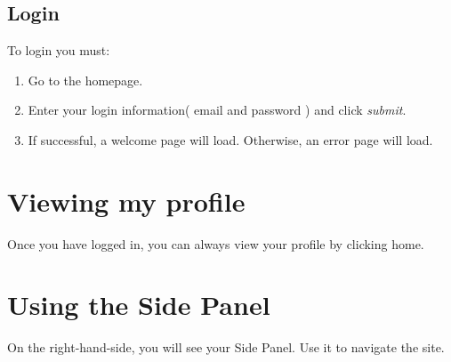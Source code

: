 \subsection{Login}
To login you must:
\begin{enumerate}
\item Go to the homepage.
\item Enter your login information( email and password ) and click \textit{submit}.
\item If successful, a welcome page will load. Otherwise, an error page will load. 
\end{enumerate}
\section{Viewing my profile}
Once you have logged in, you can always view your profile by clicking home.

\section{Using the Side Panel}
On the right-hand-side, you will see your Side Panel. Use it to navigate the site.

